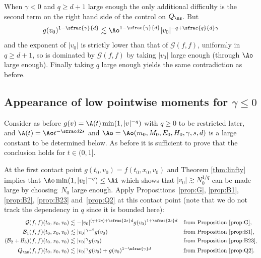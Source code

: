 When $\gamma <0$ and $q \ge d+1$ large enough the only additional
difficulty is the second term on the right hand side of the control on
$Q_{\ns}$. But
\[
g(v_0)^{1-\sfrac{\gamma}{d}} \lesssim \Ao^{1-\sfrac{\gamma}{d}} |v_0|^{-q + \sfrac{q}{d}\gamma}
\]
and the exponent of $|v_0|$ is strictly lower than that of
$\mathcal{G}(f,f)$, uniformly in $q \ge d+1$, so is dominated by
$\mathcal{G}(f,f)$ by taking $|v_0|$ large enough (through $\Ao$ large
enough). Finally taking $q$ large enough yields the same contradiction
as before.

\subsection{Appearance of low pointwise moments for $\gamma \le 0$}

Consider as before $g(v) =\A (t) \min(1,|v|^{-q})$ with $q \ge 0$ to
be restricted later, and $\A(t) = \Ao t^{-\sfrac d {2s}}$ and
$\Ao = \Ao(m_0,M_0,E_0,H_0,\gamma,s,d)$ is a large constant to be
determined below. As before it is sufficient to prove that the
conclusion holds for $t \in (0,1]$.

At the first contact point $g(t_0,v_0)=f(t_0,x_0,v_0)$ and Theorem
\ref{thm:linfty} implies that $\Ao \min(1,|v_0|^{-q}) \leq \Ai$ which
shows that $|v_0| \gtrsim N_0^{1/q}$ can be made large by choosing~$N_0$ large enough. Apply Propositions~\ref{prop:G}, \ref{prop:B1},
\ref{prop:B2}, \ref{prop:B23} and~\ref{prop:Q2} at this contact point
(note that we do not track the dependency in $q$ since it is bounded here):
\begin{align*}
\mathcal G(f,f)(t_0,x_0,v_0)
&\lesssim - |v_0|^{(\gamma+2s)+\sfrac{2s}d} g(v_0)^{1+\sfrac{2s}d}
&& \text{from Proposition \ref{prop:G}}, \\
\mathcal B_1 (f,f)(t_0,x_0,v_0)
&\lesssim |v_0|^{\gamma-2} g(v_0)
&& \text{from Proposition \ref{prop:B1}}, \\
(\mathcal B_2 + \mathcal B_3 )(f,f)(t_0,x_0,v_0)
&\lesssim |v_0|^{\gamma} g(v_0)
&& \text{from Proposition \ref{prop:B23},}\\
Q_{\ns}(f,f)(t_0,x_0,v_0)
&\lesssim |v_0|^{\gamma} g(v_0) + g(v_0)^{1-\sfrac{\gamma}d}
&& \text{from Proposition \ref{prop:Q2}}.
\end{align*}

